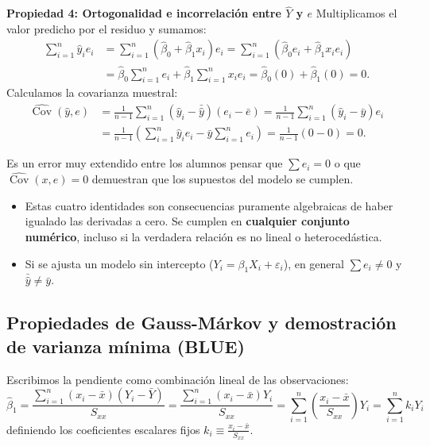 \documentclass[11pt,a4paper]{article}
\begin{document}
\begin{demobox}
\textbf{Propiedad 4: Ortogonalidad e incorrelación entre $\hat{Y}$ y $e$}  
Multiplicamos el valor predicho por el residuo y sumamos:
\begin{align}
\sum_{i=1}^n \hat{y}_i e_i &= \sum_{i=1}^n (\hat{\beta}_0 + \hat{\beta}_1 x_i) e_i = \sum_{i=1}^n (\hat{\beta}_0 e_i + \hat{\beta}_1 x_i e_i) \\
&= \hat{\beta}_0 \sum_{i=1}^n e_i + \hat{\beta}_1 \sum_{i=1}^n x_i e_i = \hat{\beta}_0 (0) + \hat{\beta}_1 (0) = 0.
\end{align}
Calculamos la covarianza muestral:
\begin{align}
\widehat{\operatorname{Cov}}(\hat{y}, e) &= \frac{1}{n-1}\sum_{i=1}^n (\hat{y}_i - \bar{\hat{y}})(e_i - \bar{e}) = \frac{1}{n-1}\sum_{i=1}^n (\hat{y}_i - \bar{y})e_i \\
&= \frac{1}{n-1}\left( \sum_{i=1}^n \hat{y}_i e_i - \bar{y}\sum_{i=1}^n e_i \right) = \frac{1}{n-1}(0 - 0) = 0.
\end{align}
\end{demobox}

\begin{alertabox}
Es un error muy extendido entre los alumnos pensar que $\sum e_i = 0$ o que $\widehat{\operatorname{Cov}}(x, e) = 0$ demuestran que los supuestos del modelo se cumplen.
\begin{itemize}
    \item Estas cuatro identidades son consecuencias puramente algebraicas de haber igualado las derivadas a cero. Se cumplen en \textbf{cualquier conjunto numérico}, incluso si la verdadera relación es no lineal o heterocedástica.
    \item Si se ajusta un modelo sin intercepto ($Y_i = \beta_1 X_i + \varepsilon_i$), en general $\sum e_i \neq 0$ y $\bar{\hat{y}} \neq \bar{y}$.
\end{itemize}
\end{alertabox}



\subsection{Propiedades de Gauss-Márkov y demostración de varianza mínima (BLUE)}

Escribimos la pendiente como combinación lineal de las observaciones:
\begin{equation}
\hat{\beta}_1 = \frac{\sum_{i=1}^n (x_i - \bar{x})(Y_i - \bar{Y})}{S_{xx}} = \frac{\sum_{i=1}^n (x_i - \bar{x})Y_i}{S_{xx}} = \sum_{i=1}^n \left(\frac{x_i - \bar{x}}{S_{xx}}\right) Y_i = \sum_{i=1}^n k_i Y_i
\end{equation}
definiendo los coeficientes escalares fijos $k_i \equiv \frac{x_i - \bar{x}}{S_{xx}}$.
\end{document}
